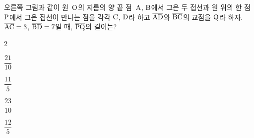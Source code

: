 \noindent\begin{minipage}[t]{0.58\linewidth}\vspace{0pt}\raggedright 오른쪽 그림과 같이 원~$\mathrm{O}$의 지름의 양 끝 점~$\mathrm{A}$, $\mathrm{B}$에서 그은 두 접선과 원 위의 한 점~$\mathrm{P}$에서 그은 접선이 만나는 점을 각각 $\mathrm{C}$, $\mathrm{D}$라 하고 $\overline{\mathrm{AD}}$와 $\overline{\mathrm{BC}}$의 교점을 $\mathrm{Q}$라 하자. $\overline{\mathrm{AC}}=3$, $\overline{\mathrm{BD}}=7$일 때, $\overline{\mathrm{PQ}}$의 길이는?\end{minipage}\hfill\begin{minipage}[t]{0.4\linewidth}\vspace{0pt}\centering \resizebox{\ifdim\width>\linewidth\linewidth\else\width\fi}{!}{}\end{minipage}\par
\begin{choices32}{\rule[-3ex]{0pt}{8ex}$2$}{\rule[-3ex]{0pt}{8ex}$\dfrac{21}{10}$}{\rule[-3ex]{0pt}{8ex}$\dfrac{11}{5}$}{\rule[-3ex]{0pt}{8ex}$\dfrac{23}{10}$}{\rule[-3ex]{0pt}{8ex}$\dfrac{12}{5}$}\end{choices32}
